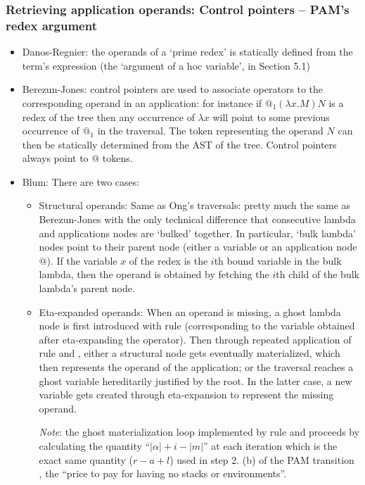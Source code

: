 \documentclass{article}
\theoremstyle{definition}
\newcommand{\ghostlmd}{{\lambda\!\!\lambda}}
\begin{document}
\subsubsection{Retrieving application operands: Control pointers -- PAM's redex argument }
\begin{itemize}
  \item Danos-Regnier: the operands of a `prime redex' is statically defined from the term's expression (the `argument of a hoc variable', in Section 5.1)

  \item Berezun-Jones: control pointers are used to associate operators to the corresponding operand in an application: for instance if $@_1 (\lambda x .M) N$ is a redex of the tree then any occurrence of $\lambda x$ will point to some previous occurrence of $@_1$ in the traversal. The token representing the operand $N$ can then be statically determined from the AST of the tree.
      Control pointers always point to $@$ tokens.

  \item Blum: There are two cases:
     \begin{itemize}
     \item Structural operands: Same as Ong's traversals: pretty much the same as Berezun-Jones with the only technical difference that consecutive lambda and applications nodes are `bulked' together. In particular, `bulk lambda' nodes point to their parent node (either a variable or an application node $@$). If the variable $x$ of the redex is the $i$th bound variable in the bulk lambda, then the operand is obtained by fetching the $i$th child of the bulk lambda's parent node.
    \item Eta-expanded operands: When an operand is missing, a ghost lambda node is first introduced with rule  (corresponding to the variable obtained after eta-expanding the operator). Then through repeated application of rule
        \rulenamet{Lam^\ghostlmd} and , either a structural node gets eventually materialized, which then represents the operand of the application; or the traversal reaches a ghost variable hereditarily justified by the root. In the latter case, a new variable gets created through eta-expansion to represent the missing operand.

        \emph{Note}: the ghost materialization loop implemented by rule \rulenamet{Lam^\ghostlmd} and  proceeds by calculating the quantity ``$|\alpha|+i-|m|$'' at each iteration which is the exact same quantity ($r-a+l$) used in step 2. (b) of the PAM transition \cite{danos-head}, the ``price to pay for having no stacks or environments''.
    \end{itemize}

\end{itemize}
\end{document}
